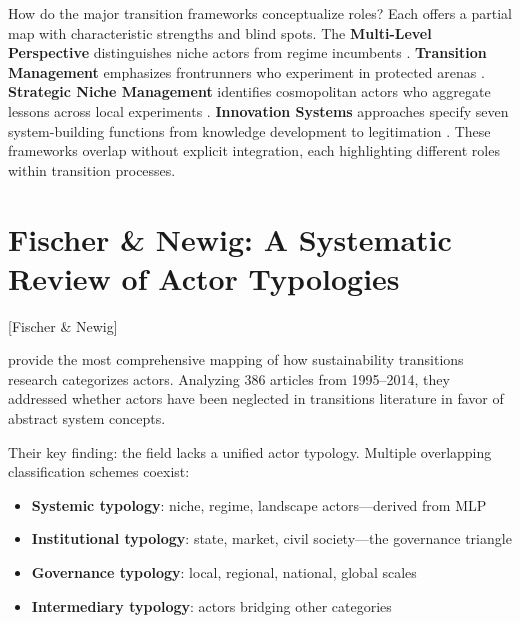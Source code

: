 \documentclass[../main.tex]{subfiles}
\begin{document}
How do the major transition frameworks conceptualize roles? Each offers a partial map with characteristic strengths and blind spots. The \textbf{Multi-Level Perspective} distinguishes niche actors from regime incumbents . \textbf{Transition Management} emphasizes frontrunners who experiment in protected arenas . \textbf{Strategic Niche Management} identifies cosmopolitan actors who aggregate lessons across local experiments . \textbf{Innovation Systems} approaches specify seven system-building functions from knowledge development to legitimation . These frameworks overlap without explicit integration, each highlighting different roles within transition processes.


\section{Fischer \& Newig: A Systematic Review of Actor Typologies}[Fischer \& Newig]

\textcite{fischernewig2016actors} provide the most comprehensive mapping of how sustainability transitions research categorizes actors. Analyzing 386 articles from 1995--2014, they addressed whether actors have been neglected in transitions literature in favor of abstract system concepts.

Their key finding: the field lacks a unified actor typology. Multiple overlapping classification schemes coexist:

\begin{itemize}[nosep]
\item \textbf{Systemic typology}: niche, regime, landscape actors---derived from MLP
\item \textbf{Institutional typology}: state, market, civil society---the governance triangle
\item \textbf{Governance typology}: local, regional, national, global scales
\item \textbf{Intermediary typology}: actors bridging other categories
\end{itemize}
\end{document}

